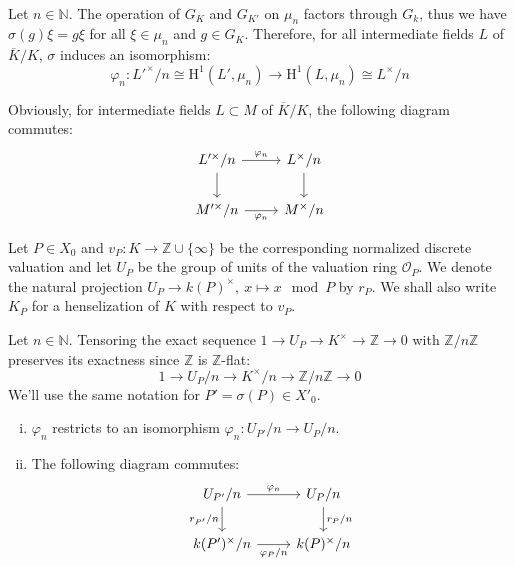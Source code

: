 \paragraph{} Let $n\in\mathbb{N}$. The operation of $G_K$ and $G_{K'}$ on $\mu_n$ factors through $G_k$, thus we have $\sigma(g)\xi = g\xi$ for all $\xi\in\mu_n$ and $g\in G_K$. Therefore, for all intermediate fields $L$ of $\overline{K}/K$, $\sigma$ induces an isomorphism:
\[ \varphi_n:L'^\times/n \cong\mathrm{H}^1(L', \mu_n) \to \mathrm{H}^1(L,\mu_n) \cong L^\times/n \]

\begin{remark}\label{remark-localphi-extension}
Obviously, for intermediate fields $L\subset M$ of $\overline{K}/K$, the following diagram commutes:
\[ \begin{tikzcd}
L'^\times/n \ar[r, "\varphi_n"]\dar & L^\times/n \dar\\
M'^\times/n \ar[r, "\varphi_n"'] & M^\times/n
\end{tikzcd} \]
\end{remark}

Let $P\in X_0$ and $v_P:K\to\mathbb{Z}\cup\{\infty\}$ be the corresponding normalized discrete valuation and let $U_P$ be the group of units of the valuation ring $\mathcal{O}_P$. We denote the natural projection $U_P\to k(P)^\times,\ x\mapsto x\mod P$ by $r_P$. We shall also write $K_P$ for a henselization of $K$ with respect to $v_P$.

Let $n\in\mathbb{N}$. Tensoring the exact sequence $1\to U_P\to K^\times \to\mathbb{Z}\to 0$ with $\mathbb{Z}/n\mathbb{Z}$ preserves its exactness since $\mathbb{Z}$ is $\mathbb{Z}$-flat:
\[ 1\longrightarrow U_P/n\longrightarrow K^\times/n\longrightarrow\mathbb{Z}/n\mathbb{Z}\longrightarrow 0 \]
We'll use the same notation for $P' = \sigma(P)\in X'_0$.

\begin{lemma}\label{4.3}
\begin{enumerate}[(i)]
\item $\varphi_n$ restricts to an isomorphism $\varphi_n: U_{P'}/n\to U_P/n$.
\item The following diagram commutes:
\[ \begin{tikzcd}
U_{P'}/n \rar["\varphi_n"] \dar["r_{P'}/n"'] & U_P/n \dar["r_P/n"]\\
k(P')^\times/n \rar["\varphi_P/n"'] & k(P)^\times/n
\end{tikzcd} \]
\end{enumerate}
\end{lemma}

